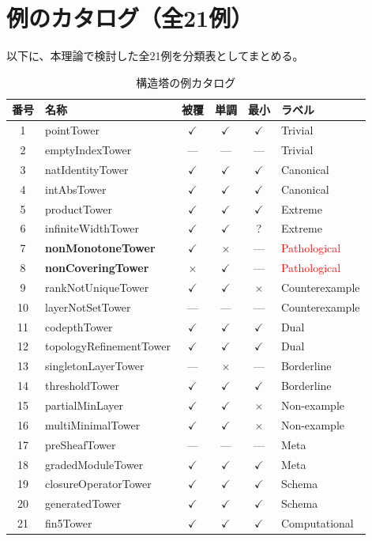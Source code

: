 \documentclass[a4paper,11pt]{ltjsarticle}
\theoremstyle{definition}
\theoremstyle{plain}
\theoremstyle{remark}
\begin{document}
\section{例のカタログ（全21例）}

以下に、本理論で検討した全21例を分類表としてまとめる。

\begin{table}[htbp]
\centering
\caption{構造塔の例カタログ}
\label{tab:catalog}
\small
\begin{tabular}{|c|l|c|c|c|l|}
\hline
\textbf{番号} & \textbf{名称} & \textbf{被覆} & \textbf{単調} & \textbf{最小} & \textbf{ラベル} \\
\hline
\hline
1 & pointTower & $\checkmark$ & $\checkmark$ & $\checkmark$ & Trivial \\
2 & emptyIndexTower & — & — & — & Trivial \\
\hline
3 & natIdentityTower & $\checkmark$ & $\checkmark$ & $\checkmark$ & Canonical \\
4 & intAbsTower & $\checkmark$ & $\checkmark$ & $\checkmark$ & Canonical \\
\hline
5 & productTower & $\checkmark$ & $\checkmark$ & $\checkmark$ & Extreme \\
6 & infiniteWidthTower & $\checkmark$ & $\checkmark$ & ? & Extreme \\
\hline
7 & \textbf{nonMonotoneTower} & $\checkmark$ & $\times$ & — & \textcolor{red}{Pathological} \\
8 & \textbf{nonCoveringTower} & $\times$ & $\checkmark$ & — & \textcolor{red}{Pathological} \\
\hline
9 & rankNotUniqueTower & $\checkmark$ & $\checkmark$ & $\times$ & Counterexample \\
10 & layerNotSetTower & — & — & — & Counterexample \\
\hline
11 & codepthTower & $\checkmark$ & $\checkmark$ & $\checkmark$ & Dual \\
12 & topologyRefinementTower & $\checkmark$ & $\checkmark$ & $\checkmark$ & Dual \\
\hline
13 & singletonLayerTower & — & $\times$ & — & Borderline \\
14 & thresholdTower & $\checkmark$ & $\checkmark$ & $\checkmark$ & Borderline \\
\hline
15 & partialMinLayer & $\checkmark$ & $\checkmark$ & $\times$ & Non-example \\
16 & multiMinimalTower & $\checkmark$ & $\checkmark$ & $\times$ & Non-example \\
\hline
17 & preSheafTower & — & — & — & Meta \\
18 & gradedModuleTower & $\checkmark$ & $\checkmark$ & $\checkmark$ & Meta \\
\hline
19 & closureOperatorTower & $\checkmark$ & $\checkmark$ & $\checkmark$ & Schema \\
20 & generatedTower & $\checkmark$ & $\checkmark$ & $\checkmark$ & Schema \\
\hline
21 & fin5Tower & $\checkmark$ & $\checkmark$ & $\checkmark$ & Computational \\
\hline
\end{tabular}
\end{table}
\end{document}
